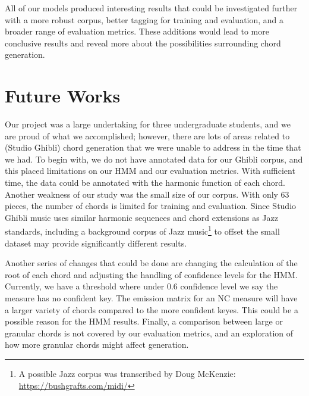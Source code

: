 \documentclass[11pt,a4paper]{article}
\begin{document}
All of our models produced interesting results that could be investigated further with a more robust corpus, better tagging for training and evaluation, and a broader range of evaluation metrics. These additions would lead to more conclusive results and reveal more about the possibilities surrounding chord generation.

\section{Future Works}
Our project was a large undertaking for three undergraduate students, and we are proud of what we accomplished; however, there are lots of areas related to (Studio Ghibli) chord generation that we were unable to address in the time that we had. To begin with, we do not have annotated data for our Ghibli corpus, and this placed limitations on our HMM and our evaluation metrics. With sufficient time, the data could be annotated with the harmonic function of each chord. Another weakness of our study was the small size of our corpus. With only 63 pieces, the number of chords is limited for training and evaluation. Since Studio Ghibli music uses similar harmonic sequences and chord extensions as Jazz standards, including a background corpus of Jazz music\footnote{A possible Jazz corpus was transcribed by Doug McKenzie: \url{https://bushgrafts.com/midi/}} to offset the small dataset may provide significantly different results.

Another series of changes that could be done are changing the calculation of the root of each chord and adjusting the handling of confidence levels for the HMM. Currently, we have a threshold where under 0.6 confidence level we say the measure has no confident key. The emission matrix for an NC measure will have a larger variety of chords compared to the more confident keyes. This could be a possible reason for the HMM results. Finally, a comparison between large or granular chords is not covered by our evaluation metrics, and an exploration of how more granular chords might affect generation.



 

\end{document}
